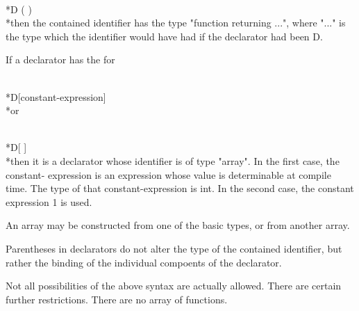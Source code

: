 	\\*D ( )
\\*then the contained identifier has the type "function returning ...", where "..." is the type which the identifier would have had if the declarator had been D.

If a declarator has the for

	\\*D[constant-expression]
\\*or

	\\*D[ ]	
\\*then it is a declarator whose identifier is of type "array". In the first case, the constant- expression is an expression whose value is determinable at compile time.  The type of that constant-expression is int. In the second case, the constant expression 1 is used. 

An array may be constructed from one of the basic types, or from another array.

Parentheses in declarators do not alter the type of the contained identifier, but rather the binding of the individual compoents of the declarator.

Not all possibilities of the above syntax are actually allowed. There are certain further restrictions. There are no array of functions.
